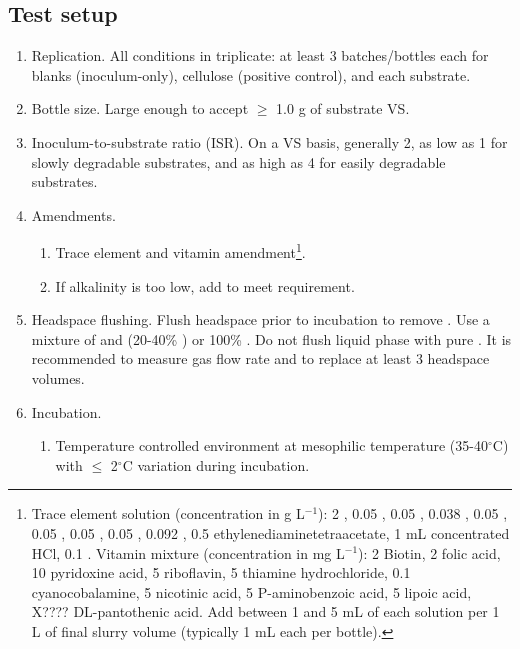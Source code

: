 \documentclass[]{article}
\begin{document}
\subsection{Test setup}
\begin{enumerate}
  \item Replication. All conditions in triplicate: at least 3 batches/bottles each for blanks (inoculum-only), cellulose (positive control), and each substrate. 
  \item Bottle size. Large enough to accept $\ge$ 1.0 g of substrate VS.
  \item Inoculum-to-substrate ratio (ISR). On a VS basis, generally 2, as low as 1 for slowly degradable substrates, and as high as 4 for easily degradable substrates.
  \item Amendments. 
    \begin{enumerate}
      \item Trace element and vitamin amendment\footnote{
          Trace element solution (concentration in g L$^{-1}$): 2 , 0.05 , 0.05 , 0.038 , 0.05 , 
          0.05 , 0.05 , 0.05 , 0.092 , 0.5 ethylenediaminetetraacetate, 1 mL concentrated HCl, 
          0.1 .
          \newline
          Vitamin mixture (concentration in mg L$^{-1}$): 2 Biotin, 2 folic acid, 10 pyridoxine acid, 5 riboflavin, 5 thiamine hydrochloride, 0.1 cyanocobalamine, 
          5 nicotinic acid, 5 P-aminobenzoic acid, 5 lipoic acid, X???? DL-pantothenic acid.
          \newline
          Add between 1 and 5 mL of each solution per 1 L of final slurry volume (typically 1 mL each per bottle).
        }.
      \item If alkalinity is too low, add  to meet requirement.
    \end{enumerate}
  \item Headspace flushing. Flush headspace prior to incubation to remove . 
    Use a mixture of  and  (20-40\% ) or 100\% . Do not flush liquid phase with pure . 
    It is recommended to measure gas flow rate and to replace at least 3 headspace volumes.
  \item Incubation.
    \begin{enumerate}
      \item Temperature controlled environment at mesophilic temperature (35-40$^\circ$C) with $\le$ 2$^\circ$C variation during incubation. 

\end{enumerate}
\end{enumerate}
\end{document}
